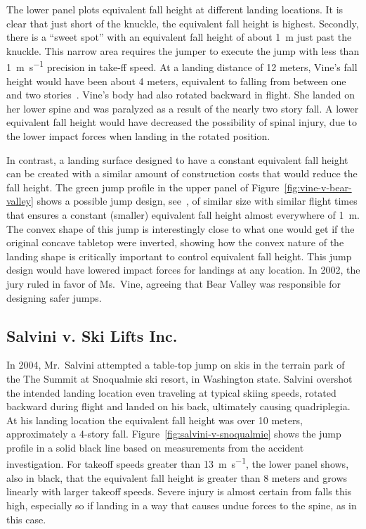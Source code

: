 \documentclass{article}
\begin{document}
The lower panel plots equivalent fall height at different landing locations. It
is clear that just short of the knuckle, the equivalent fall height is highest.
Secondly, there is a ``sweet spot'' with an equivalent fall height of about
1~\si{\meter} just past the knuckle. This narrow area requires the jumper to
execute the jump with less than 1~\si{\meter\per\second} precision in take-ff
speed.  At a landing distance of 12 meters, Vine's fall height would have been
about 4 meters, equivalent to falling from between one and two
stories~\cite{Vish2005}. Vine's body had also rotated backward in flight. She
landed on her lower spine and was paralyzed as a result of the nearly two story
fall. A lower equivalent fall height would have decreased the possibility of
spinal injury, due to the lower impact forces when landing in the rotated
position.

In contrast, a landing surface designed to have a constant equivalent fall
height can be created with a similar amount of construction costs that would
reduce the fall height.  The green jump profile in the upper panel of
Figure~\ref{fig:vine-v-bear-valley} shows a possible jump design,
see~\cite{Levy2015}, of similar size with similar flight times that ensures a
constant (smaller) equivalent fall height almost everywhere of 1~\si{\meter}.
The convex shape of this jump is interestingly close to what one would get if
the original concave tabletop were inverted, showing how the convex nature of
the landing shape is critically important to control equivalent fall height.
This jump design would have lowered impact forces for landings at any location.
In 2002, the jury ruled in favor of Ms.~Vine, agreeing that Bear Valley was
responsible for designing safer jumps.

\subsection{Salvini v. Ski Lifts Inc.}
%
In 2004, Mr.~Salvini attempted a table-top jump on skis in the terrain park of
the The Summit at Snoqualmie ski resort, in Washington state. Salvini overshot
the intended landing location even traveling at typical skiing speeds, rotated
backward during flight and landed on his back, ultimately causing quadriplegia.
At his landing location the equivalent fall height was over 10 meters,
approximately a 4-story fall.  Figure~\ref{fig:salvini-v-snoqualmie} shows the
jump profile in a solid black line based on measurements from the accident
investigation.  For takeoff speeds greater than 13~\si{\meter\per\second}, the
lower panel shows, also in black, that the equivalent fall height is greater
than 8 meters and grows linearly with larger takeoff speeds. Severe injury is
almost certain from falls this high, especially so if landing in a way that
causes undue forces to the spine, as in this case.
\end{document}
